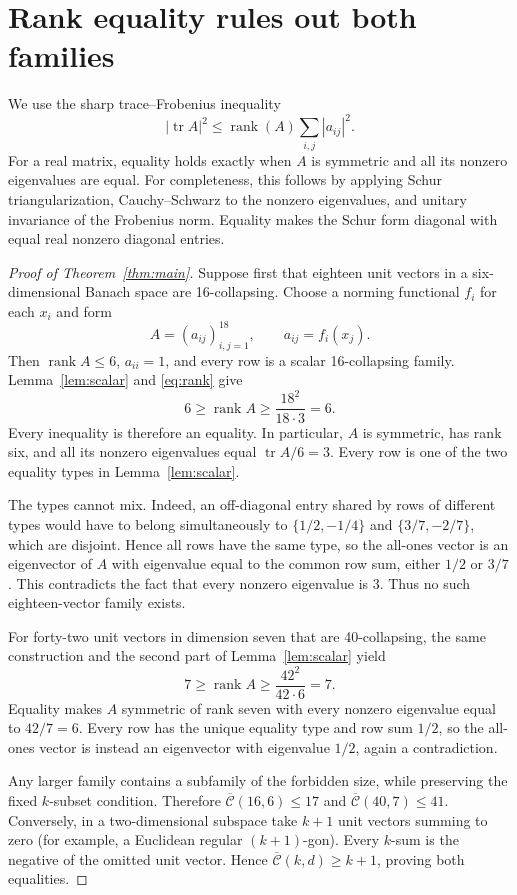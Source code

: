 \documentclass[10pt]{article}
\newcommand{\Cbar}{\overline{\mathcal C}}
\newcommand{\rank}{\operatorname{rank}}
\begin{document}
\section{Rank equality rules out both families}

We use the sharp trace--Frobenius inequality
\begin{equation}\label{eq:rank}
 |\operatorname{tr}A|^2\le \rank(A)\sum_{i,j}|a_{ij}|^2.
\end{equation}
For a real matrix, equality holds exactly when $A$ is symmetric and all its
nonzero eigenvalues are equal. For completeness, this follows by applying
Schur triangularization, Cauchy--Schwarz to the nonzero eigenvalues, and
unitary invariance of the Frobenius norm. Equality makes the Schur form
diagonal with equal real nonzero diagonal entries.

\begin{proof}[Proof of Theorem~\ref{thm:main}]
Suppose first that eighteen unit vectors in a six-dimensional Banach space are
16-collapsing. Choose a norming functional $f_i$ for each $x_i$ and form
\[
 A=(a_{ij})_{i,j=1}^{18},\qquad a_{ij}=f_i(x_j).
\]
Then $\rank A\le6$, $a_{ii}=1$, and every row is a scalar 16-collapsing
family. Lemma~\ref{lem:scalar} and \eqref{eq:rank} give
\[
 6\ge\rank A\ge\frac{18^2}{18\cdot3}=6.
\]
Every inequality is therefore an equality. In particular, $A$ is symmetric,
has rank six, and all its nonzero eigenvalues equal
$\operatorname{tr}A/6=3$. Every row is one of the two equality types in
Lemma~\ref{lem:scalar}.

The types cannot mix. Indeed, an off-diagonal entry shared by rows of different
types would have to belong simultaneously to
$\{1/2,-1/4\}$ and $\{3/7,-2/7\}$, which are disjoint. Hence all rows have
the same type, so the all-ones vector is an eigenvector of $A$ with eigenvalue
equal to the common row sum, either $1/2$ or $3/7$. This contradicts the fact
that every nonzero eigenvalue is $3$. Thus no such eighteen-vector family
exists.

For forty-two unit vectors in dimension seven that are 40-collapsing, the
same construction and the second part of Lemma~\ref{lem:scalar} yield
\[
 7\ge\rank A\ge\frac{42^2}{42\cdot6}=7.
\]
Equality makes $A$ symmetric of rank seven with every nonzero eigenvalue equal
to $42/7=6$. Every row has the unique equality type and row sum $1/2$, so the
all-ones vector is instead an eigenvector with eigenvalue $1/2$, again a
contradiction.

Any larger family contains a subfamily of the forbidden size, while preserving
the fixed $k$-subset condition. Therefore $\Cbar(16,6)\le17$ and
$\Cbar(40,7)\le41$. Conversely, in a two-dimensional subspace take $k+1$
unit vectors summing to zero (for example, a Euclidean regular $(k+1)$-gon).
Every $k$-sum is the negative of the omitted unit vector. Hence
$\Cbar(k,d)\ge k+1$, proving both equalities.
\end{proof}
\end{document}
